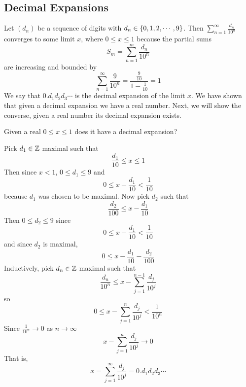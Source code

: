 \documentclass{article}
\begin{document}
\subsection{Decimal Expansions}
Let $(d_n)$ be a sequence of digits with $d_n \in \left\{ 0, 1, 2, \cdots, 9 \right\}$.
Then $\sum_{n=1}^\infty \frac{d_n}{10^n}$ converges to some limit $x$, where $0 \leq x \leq 1$
because the partial sums
\[
    S_m = \sum_{n=1}^m \frac{d_n}{10^n}
\]
are increasing and bounded by
\[
    \sum_{n=1}^\infty \frac{9}{10^n} = \frac{\frac{9}{10}}{1 - \frac{1}{10}} = 1
\]
We say that $0.d_1d_2d_3\cdots$ is the decimal expansion of the limit $x$.
We have shown that given a decimal expansion we have a real number.
Next, we will show the converse, given a real number its decimal expansion exists.

\begin{question}
    Given a real $0 \leq x \leq 1$ does it have a decimal expansion?
\end{question}
Pick $d_1 \in \mathbb{Z}$ maximal such that
\[
    \frac{d_1}{10} \leq x \leq 1
\]
Then since $x < 1$, $0 \leq d_1 \leq 9$ and
\[
    0 \leq x - \frac{d_1}{10} < \frac{1}{10}
\]
because $d_1$ was chosen to be maximal.
Now pick $d_2$ such that
\[
    \frac{d_2}{100} \leq x - \frac{d_1}{10}
\]
Then $0 \leq d_2 \leq 9$ since 
\[
    0 \leq x - \frac{d_1}{10} < \frac{1}{10}
\]
and since $d_2$ is maximal, 
\[
    0 \leq x - \frac{d_1}{10} - \frac{d_2}{100} 
\]
Inductively, pick $d_n \in \mathbb{Z}$ maximal such that
\[
    \frac{d_n}{10^n} \leq x - \sum_{j=1}^{n-1} \frac{d_j}{10^j}
\]
so
\[
    0 \leq x - \sum_{j=1}^{n} \frac{d_j}{10^j} < \frac{1}{10^n}
\]
Since $\frac{1}{10^n} \rightarrow 0$ as $n \rightarrow \infty$
\[
    x - \sum_{j=1}^{n} \frac{d_j}{10^j} \rightarrow 0
\]
That is,
\[
    x = \sum_{j=1}^{\infty} \frac{d_j}{10^j} = 0.d_1d_2d_3\cdots
\]
\end{document}
